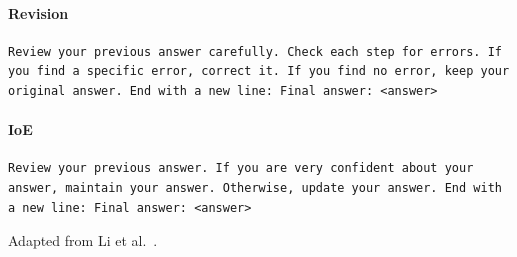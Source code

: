 \paragraph{Revision}\mbox{}\par\nopagebreak
\begin{lstlisting}
Review your previous answer carefully. Check each step for errors. If you find a specific error, correct it. If you find no error, keep your original answer. End with a new line: Final answer: <answer>
\end{lstlisting}

\paragraph{IoE}\mbox{}\par\nopagebreak
\begin{lstlisting}
Review your previous answer. If you are very confident about your answer, maintain your answer. Otherwise, update your answer. End with a new line: Final answer: <answer>
\end{lstlisting}
Adapted from Li et al.~\cite{li2024confidence}.
